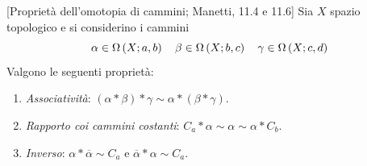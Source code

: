 \begin{property}{}[Proprietà dell'omotopia di cammini; Manetti, 11.4 e 11.6]\label{propcammini}
Sia $X$ spazio topologico e si considerino i cammini
	\begin{equation*}
	\alpha\in\Omega\left(X; a,b\right)\quad\beta\in\Omega\left(X; b,c\right)\quad\gamma\in\Omega\left(X; c,d\right)
	\end{equation*}
Valgono le seguenti proprietà:
\begin{enumerate}
	\item \textit{Associatività}: $\left(\alpha\ast\beta\right)\ast \gamma \sim \alpha\ast\left(\beta\ast\gamma\right)$.
	\item \textit{Rapporto coi cammini costanti}: $C_a\ast \alpha \sim \alpha \sim \alpha \ast C_b$.
	\item \textit{Inverso}: $\alpha\ast\overline{\alpha}\sim C_a$ e $\overline{\alpha}\ast\alpha\sim C_a$.
\end{enumerate}
\end{property}
